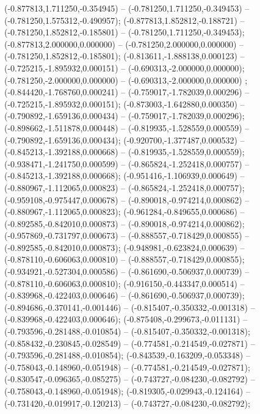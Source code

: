  (-0.877813,1.711250,-0.354945) -- (-0.781250,1.711250,-0.349453) -- (-0.781250,1.575312,-0.490957);
 (-0.877813,1.852812,-0.188721) -- (-0.781250,1.852812,-0.185801) -- (-0.781250,1.711250,-0.349453);
 (-0.877813,2.000000,0.000000) -- (-0.781250,2.000000,0.000000) -- (-0.781250,1.852812,-0.185801);
 (-0.813611,-1.888138,0.000123) -- (-0.725215,-1.895932,0.000151) -- (-0.690313,-2.000000,0.000000);
 (-0.781250,-2.000000,0.000000) -- (-0.690313,-2.000000,0.000000) ;
 (-0.844420,-1.768760,0.000241) -- (-0.759017,-1.782039,0.000296) -- (-0.725215,-1.895932,0.000151);
 (-0.873003,-1.642880,0.000350) -- (-0.790892,-1.659136,0.000434) -- (-0.759017,-1.782039,0.000296);
 (-0.898662,-1.511878,0.000448) -- (-0.819935,-1.528559,0.000559) -- (-0.790892,-1.659136,0.000434);
 (-0.920700,-1.377487,0.000532) -- (-0.845213,-1.392188,0.000668) -- (-0.819935,-1.528559,0.000559);
 (-0.938471,-1.241750,0.000599) -- (-0.865824,-1.252418,0.000757) -- (-0.845213,-1.392188,0.000668);
 (-0.951416,-1.106939,0.000649) -- (-0.880967,-1.112065,0.000823) -- (-0.865824,-1.252418,0.000757);
 (-0.959108,-0.975447,0.000678) -- (-0.890018,-0.974214,0.000862) -- (-0.880967,-1.112065,0.000823);
 (-0.961284,-0.849655,0.000686) -- (-0.892585,-0.842010,0.000873) -- (-0.890018,-0.974214,0.000862);
 (-0.957869,-0.731797,0.000673) -- (-0.888557,-0.718429,0.000855) -- (-0.892585,-0.842010,0.000873);
 (-0.948981,-0.623824,0.000639) -- (-0.878110,-0.606063,0.000810) -- (-0.888557,-0.718429,0.000855);
 (-0.934921,-0.527304,0.000586) -- (-0.861690,-0.506937,0.000739) -- (-0.878110,-0.606063,0.000810);
 (-0.916150,-0.443347,0.000514) -- (-0.839968,-0.422403,0.000646) -- (-0.861690,-0.506937,0.000739);
 (-0.894686,-0.370141,-0.001446) -- (-0.815407,-0.350332,-0.001318) -- (-0.839968,-0.422403,0.000646);
 (-0.875408,-0.299673,-0.011131) -- (-0.793596,-0.281488,-0.010854) -- (-0.815407,-0.350332,-0.001318);
 (-0.858432,-0.230845,-0.028549) -- (-0.774581,-0.214549,-0.027871) -- (-0.793596,-0.281488,-0.010854);
 (-0.843539,-0.163209,-0.053348) -- (-0.758043,-0.148960,-0.051948) -- (-0.774581,-0.214549,-0.027871);
 (-0.830547,-0.096365,-0.085275) -- (-0.743727,-0.084230,-0.082792) -- (-0.758043,-0.148960,-0.051948);
 (-0.819305,-0.029943,-0.124164) -- (-0.731420,-0.019917,-0.120213) -- (-0.743727,-0.084230,-0.082792);
